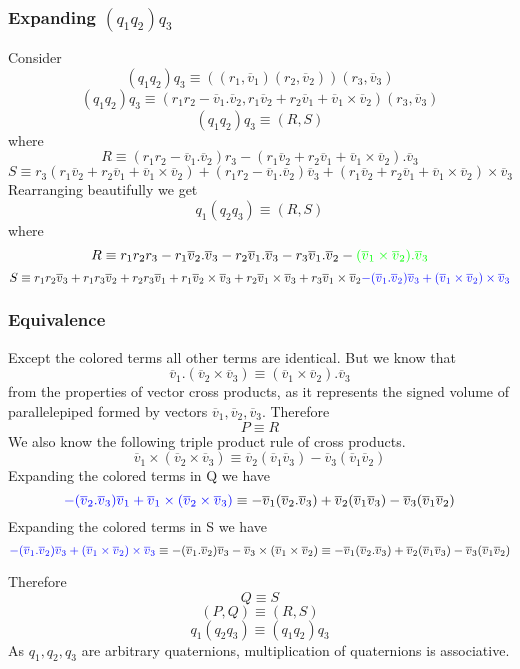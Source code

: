 \documentclass[12pt]{article}
\newcommand{\vv}[1]{\overline{v}_{#1}}
\begin{document}
\subsubsection*{Expanding $(q_1q_2)q_3$}
Consider
\[
  (q_1q_2)q_3 \equiv ((r_1, \vv{1})(r_2, \vv{2}))(r_3, \vv{3})
\]
\[
  (q_1q_2)q_3 \equiv (r_1r_2 - \vv{1}.\vv{2}, r_1 \vv{2} + r_2 \vv{1} + \vv{1}\times\vv{2}) (r_3, \vv{3})
\]
\[
  (q_1q_2)q_3 \equiv (R, S)
\]
where
\[
  R \equiv (r_1r_2 - \vv{1}.\vv{2})r_3 - (r_1 \vv{2} + r_2 \vv{1} + \vv{1}\times\vv{2}).\vv{3}
\]
\[
  S \equiv
    r_3(r_1 \vv{2} + r_2 \vv{1} + \vv{1}\times\vv{2})
    + (r_1r_2 - \vv{1}.\vv{2})\vv{3}
    + (r_1 \vv{2} + r_2 \vv{1} + \vv{1}\times\vv{2}) \times \vv{3}
\]
Rearranging beautifully we get
\[
  q_1(q_2q_3) \equiv (R, S)
\]
where
\[
  R \equiv r_1r_2r_3 - r_1\vv{2}.\vv{3} - r_2\vv{1}.\vv{3} - r_3\vv{1}.\vv{2} - {\color{green} (\vv{1}\times\vv{2}).\vv{3}}
\]
\[
  S \equiv
  r_1r_2\vv{3}
  + r_1r_3\vv{2}
  + r_2r_3\vv{1}
  + r_1 \vv{2}\times\vv{3}
  + r_2 \vv{1}\times\vv{3}
  + r_3 \vv{1}\times\vv{2}
  {\color{blue}
  - (\vv{1}.\vv{2})\vv{3}
  + (\vv{1}\times\vv{2})\times\vv{3}}
\]

\subsubsection*{Equivalence}
Except the colored terms all other terms are identical.
But we know that
\[
  \vv{1}.(\vv{2}\times\vv{3}) \equiv (\vv{1}\times\vv{2}).\vv{3}
\]
from the properties of vector cross products, as it represents the signed volume of parallelepiped formed by vectors $\vv{1}, \vv{2}, \vv{3}$.
Therefore
\[
P \equiv R
\]
We also know the following triple product rule of cross products.
\[
  \vv{1} \times (\vv{2}\times\vv{3})
  \equiv
  \vv{2} (\vv{1}\vv{3})
  - \vv{3} (\vv{1}\vv{2})
\]
Expanding the colored terms in Q we have
\[
  {\color{blue}
  - (\vv{2}.\vv{3})\vv{1}
  + \vv{1} \times (\vv{2}\times\vv{3})
  }
  \equiv
  - \vv{1} (\vv{2}.\vv{3})
  + \vv{2} (\vv{1}\vv{3})
  - \vv{3} (\vv{1}\vv{2})
\]
Expanding the colored terms in S we have
\[
  {\color{blue}
  - (\vv{1}.\vv{2})\vv{3}
  + (\vv{1}\times\vv{2})\times\vv{3}
  }
  \equiv
  - (\vv{1}.\vv{2})\vv{3}
  - \vv{3}\times(\vv{1}\times\vv{2})
  \equiv
  - \vv{1} (\vv{2}.\vv{3})
  + \vv{2} (\vv{1}\vv{3})
  - \vv{3} (\vv{1}\vv{2})
\]

Therefore
\[
Q \equiv S
\]
\[
  (P, Q) \equiv (R, S)
\]
\[
  q_1(q_2q_3) \equiv (q_1q_2)q_3
\]
As $q_1, q_2, q_3$ are arbitrary quaternions, multiplication of quaternions is associative.
\end{document}
